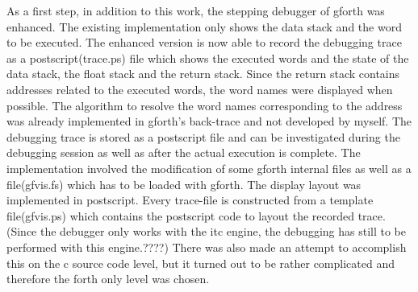 As a first step, in addition to this work, the stepping debugger of gforth was enhanced. The existing implementation only shows the data stack and the word to be executed. The enhanced version is now able to record the debugging trace as a postscript(trace.ps) file which shows the executed words and the state of the data stack, the float stack and the return stack. Since the return stack contains addresses related to the executed words, the word names were displayed when possible. The algorithm to resolve the word names corresponding to the address was already implemented in gforth's back-trace and not developed by myself. The debugging trace is stored as a postscript file and can be investigated during the debugging session as well as after the actual execution is complete.
The implementation involved the modification of some gforth internal files as well as a file(gfvis.fs) which has to be loaded with gforth.
The display layout was implemented in postscript. Every trace-file is constructed from a template file(gfvis.ps) which contains the postscript code to layout the recorded trace.
(Since the debugger only works with the itc engine, the debugging has still to be performed with this engine.????)
There was also made an attempt to accomplish this on the c source code level, but it turned out to be rather complicated and therefore the forth only level was chosen.
